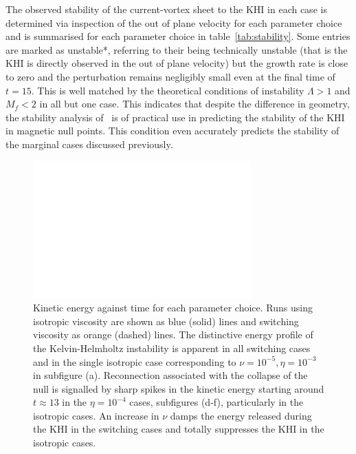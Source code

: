 The observed stability of the current-vortex sheet to the KHI in each case is determined via inspection of the out of plane velocity for each parameter choice and is summarised for each parameter choice in table~\ref{tab:stability}. Some entries are marked as unstable*, referring to their being technically unstable (that is the KHI is directly observed in the out of plane velocity) but the growth rate is close to zero and the perturbation remains negligibly small even at the final time of $t=15$. This is well matched by the theoretical conditions of instability $\Lambda > 1$ and $M_f < 2$ in all but one case. This indicates  that despite the difference in geometry, the stability analysis of~\cite{einaudiResistiveInstabilitiesFlowing1986} is of practical use in predicting the stability of the KHI in magnetic null points. This condition even accurately predicts the stability of the marginal cases discussed previously. 

\begin{figure}[h]
  \centering
  \includegraphics[width=\linewidth]{param_study/kinetic_energies.pdf}
  \caption{Kinetic energy against time for each parameter choice. Runs using isotropic viscosity are shown as blue (solid) lines and switching viscosity as orange (dashed) lines. The distinctive energy profile of the Kelvin-Helmholtz instability is apparent in all switching cases and in the single isotropic case corresponding to $\nu = 10^{-5}, \eta = 10^{-3}$ in subfigure (a). Reconnection associated with the collapse of the null is signalled by sharp spikes in the kinetic energy starting around $t\approx13$ in the $\eta = 10^{-4}$ cases, subfigures (d-f), particularly in the isotropic cases. An increase in $\nu$ damps the energy released during the KHI in the switching cases and totally suppresses the KHI in the isotropic cases.}%
  \label{fig:param_study_kinetic_energies}
\end{figure}

